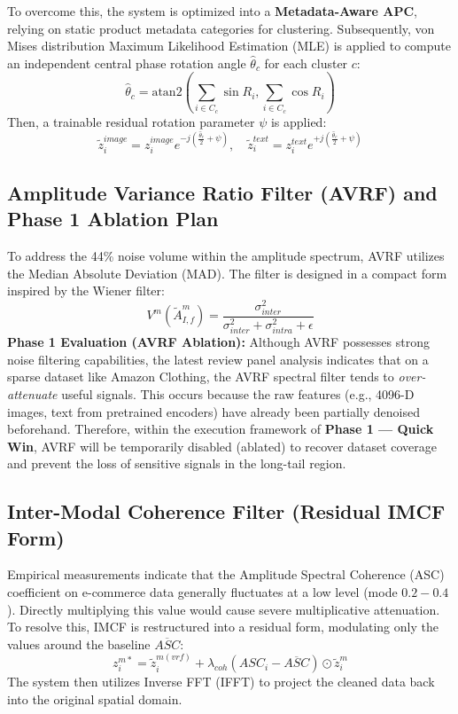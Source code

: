 \documentclass[12pt, a4paper]{article}
\begin{document}
To overcome this, the system is optimized into a \textbf{Metadata-Aware APC}, relying on static product metadata categories for clustering. Subsequently, von Mises distribution Maximum Likelihood Estimation (MLE) is applied to compute an independent central phase rotation angle $\hat{\theta}_c$ for each cluster $c$:
\begin{equation}
\hat{\theta}_c = \text{atan2}\left(\sum_{i \in C_c} \sin R_i, \sum_{i \in C_c} \cos R_i\right)
\end{equation}
Then, a trainable residual rotation parameter $\psi$ is applied:
\begin{equation}
\tilde{z}_i^{image} = z_i^{image}e^{-j(\frac{\hat{\theta}_c}{2} + \psi)}, \quad \tilde{z}_i^{text} = z_i^{text}e^{+j(\frac{\hat{\theta}_c}{2} + \psi)}
\end{equation}

\subsection{Amplitude Variance Ratio Filter (AVRF) and Phase 1 Ablation Plan}
To address the 44\% noise volume within the amplitude spectrum, AVRF utilizes the Median Absolute Deviation (MAD). The filter is designed in a compact form inspired by the Wiener filter:
\begin{equation}
V^m(\tilde{A}_{I,f}^m) = \frac{\sigma_{inter}^2}{\sigma_{inter}^2 + \sigma_{intra}^2 + \epsilon}
\end{equation}
\textbf{Phase 1 Evaluation (AVRF Ablation):} Although AVRF possesses strong noise filtering capabilities, the latest review panel analysis indicates that on a sparse dataset like Amazon Clothing, the AVRF spectral filter tends to \textit{over-attenuate} useful signals. This occurs because the raw features (e.g., 4096-D images, text from pretrained encoders) have already been partially denoised beforehand. Therefore, within the execution framework of \textbf{Phase 1 --- Quick Win}, AVRF will be temporarily disabled (ablated) to recover dataset coverage and prevent the loss of sensitive signals in the long-tail region.

\subsection{Inter-Modal Coherence Filter (Residual IMCF Form)}
Empirical measurements indicate that the Amplitude Spectral Coherence (ASC) coefficient on e-commerce data generally fluctuates at a low level (mode $0.2-0.4$). Directly multiplying this value would cause severe multiplicative attenuation. To resolve this, IMCF is restructured into a residual form, modulating only the values around the baseline $\overline{ASC}$:
\begin{equation}
z_i^{m*} = \tilde{z}_i^{m(vrf)} + \lambda_{coh}(ASC_i - \overline{ASC}) \odot \tilde{z}_i^m
\end{equation}
The system then utilizes Inverse FFT (IFFT) to project the cleaned data back into the original spatial domain.
\end{document}
